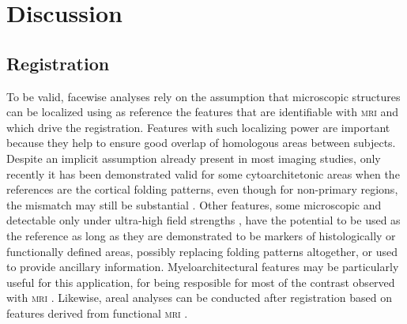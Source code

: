 \section{Discussion}

\subsection{Registration}

To be valid, facewise analyses rely on the assumption that microscopic structures can be localized using as reference the features that are identifiable with \textsc{mri} and which drive the registration. Features with such localizing power are important because they help to ensure good overlap of homologous areas between subjects. Despite an implicit assumption already present in most imaging studies, only recently it has been demonstrated valid for some cytoarchitetonic areas when the references are the cortical folding patterns, even though for non-primary regions, the mismatch may still be substantial \citep{Fischl2008, Fischl2009, Hinds2008, Hinds2009, DaCosta2011}. Other features, some microscopic and detectable only under ultra-high field strengths \citep{Augustinack2005, Bridge2006, Duyn2007, Kim2009}, have the potential to be used as the reference as long as they are demonstrated to be markers of histologically or functionally defined areas, possibly replacing folding patterns altogether, or used to provide ancillary information. Myeloarchitectural features may be particularly useful for this application, for being resposible for most of the contrast observed with \textsc{mri} \citep{Geyer2011}. Likewise, areal analyses can be conducted after registration based on features derived from functional \textsc{mri} \citep{Sabuncu2010}.

